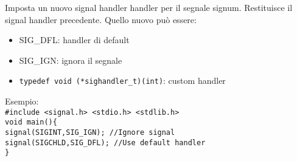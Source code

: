 \begin{flushleft}
\begin{flushleft}
    Imposta un nuovo signal handler handler per il segnale signum. Restituisce il 
    signal handler precedente. Quello nuovo può essere:
    \begin{itemize}
      \item SIG\_DFL: handler di default
      \item SIG\_IGN: ignora il segnale
      \item \texttt{typedef void (*sighandler\_t)(int)}: custom handler
    \end{itemize}
    Esempio: \\
    \texttt{\#include <signal.h> <stdio.h> <stdlib.h>\\
    void main()\{\\
    \halftab signal(SIGINT,SIG\_IGN); //Ignore signal\\
    \halftab signal(SIGCHLD,SIG\_DFL); //Use default handler\\
    \}}
  \end{flushleft}

\end{flushleft}
